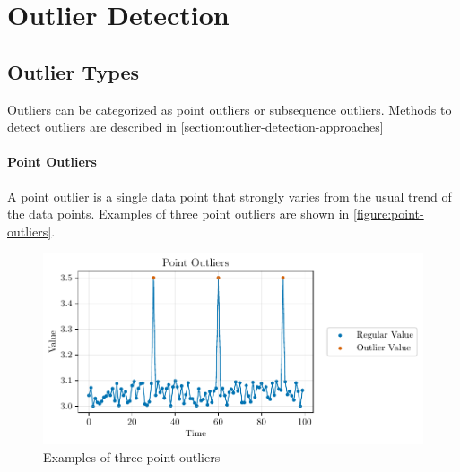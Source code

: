 \chapter{Outlier Detection}\label{chapter:outlier-detection}
\section{Outlier Types}\label{section:outlier-detection}
Outliers can be categorized as point outliers or subsequence outliers. Methods to detect outliers are described in \autoref{section:outlier-detection-approaches} %

\subsubsection{Point Outliers}
A point outlier is a single data point that strongly varies from the usual trend of the data points. \cite{blazquez-garciaReviewOutlierAnomaly2020} Examples of three point outliers are shown in \autoref{figure:point-outliers}. 
\begin{figure}[h]
  \centering
  \includegraphics{./plots/pdfs/point_outliers.pdf}
  \caption{Examples of three point outliers}
  \label{figure:point-outliers}
\end{figure}

